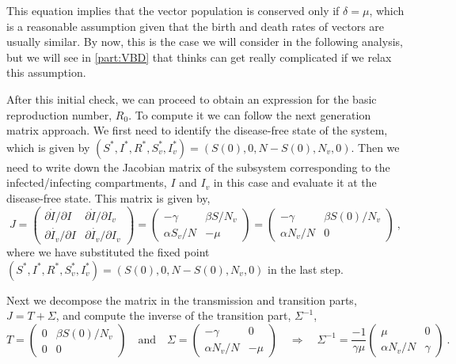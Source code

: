 This equation implies that the vector population is conserved only if
$\delta=\mu$, which is a reasonable assumption given that the birth and death
rates of vectors are usually similar. By now, this is the case we will
consider in the following analysis, but we will see in \cref{part:VBD}
that thinks can get really complicated if we relax this assumption.

After this initial check, we can proceed to obtain an expression for the basic
reproduction number, $R_0$. To compute it we can follow the next generation
matrix approach. We first need to identify the disease-free state of the
system, which is given by $(S^*,I^*,R^*,S_v^*,I_v^*)=(S(0),0,N-S(0),N_v,0)$.
Then we need to write down the Jacobian matrix of the subsystem corresponding
to the infected/infecting compartments, $I$ and $I_v$ in this case and evaluate
it at the disease-free state. This matrix is given by,
\begin{equation}
  J=\begin{pmatrix}
    \partial \dot{I}/\partial I   & \partial \dot{I}/\partial I_v   \\
    \partial \dot{I_v}/\partial I & \partial \dot{I_v}/\partial I_v
  \end{pmatrix}=
  \begin{pmatrix}
    -\gamma      & \beta S/N_v \\
    \alpha S_v/N & -\mu
  \end{pmatrix}=
  \begin{pmatrix}
    -\gamma      & \beta S(0)/N_v \\
    \alpha N_v/N & 0
  \end{pmatrix} \ ,
\end{equation}
where we have substituted the fixed point
$(S^*,I^*,R^*,S_v^*,I_v^*)=(S(0),0,N-S(0),N_v,0)$ in the last step.

Next we decompose the matrix in the transmission and transition parts,
$J=T+\Sigma$, and compute the inverse of the transition part, $\Sigma^{-1}$,
\begin{equation}
  T=\begin{pmatrix}
    0 & \beta S(0)/N_v \\
    0 & 0
  \end{pmatrix} \quad \text{and} \quad
  \Sigma=\begin{pmatrix}
    -\gamma      & 0    \\
    \alpha N_v/N & -\mu
  \end{pmatrix} \quad \Longrightarrow \quad
  \Sigma^{-1}=\frac{-1}{\gamma\mu}\begin{pmatrix}
    \mu          & 0      \\
    \alpha N_v/N & \gamma
  \end{pmatrix} \ .
\end{equation}

